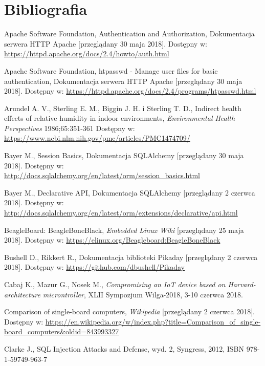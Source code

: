 \documentclass[a4paper,11pt,twoside]{article}
\begin{document}
\newpage
\section{Bibliografia}
\begin{thebibliography}{9}

Apache Software Foundation, Authentication and Authorization, Dokumentacja serwera HTTP Apache [przeglądany 30 maja 2018].
Dostępny w: \url{https://httpd.apache.org/docs/2.4/howto/auth.html}

Apache Software Foundation, htpasswd - Manage user files for basic authentication, Dokumentacja serwera HTTP Apache [przeglądany 30 maja 2018].
Dostępny w: \url{https://httpd.apache.org/docs/2.4/programs/htpasswd.html}

Arundel A. V., Sterling E. M., Biggin J. H. i Sterling T. D., Indirect health effects of relative humidity in indoor environments, \textit{Environmental Health Perspectives} 1986;65:351-361
Dostępny w: \url{https://www.ncbi.nlm.nih.gov/pmc/articles/PMC1474709/}

Bayer M., Session Basics, Dokumentacja SQLAlchemy [przeglądany 30 maja 2018].
Dostępny w: \url{http://docs.sqlalchemy.org/en/latest/orm/session_basics.html}

Bayer M., Declarative API, Dokumentacja SQLAlchemy [przeglądany 2 czerwca 2018].
Dostępny w: \url{http://docs.sqlalchemy.org/en/latest/orm/extensions/declarative/api.html}

BeagleBoard: BeagleBoneBlack, \textit{Embedded Linux Wiki} [przeglądany 25 maja 2018].
Dostępny w: \url{https://elinux.org/Beagleboard:BeagleBoneBlack}

Bushell D., Rikkert R., Dokumentacja biblioteki Pikaday [przeglądany 2 czerwca 2018].
Dostępny w: \url{https://github.com/dbushell/Pikaday}

Cabaj K., Mazur G., Nosek M., \textit{Compromising an IoT device based on Harvard-architecture microntroller}, XLII Sympozjum Wilga-2018, 3-10 czerwca 2018.

Comparison of single-board computers, \textit{Wikipedia} [przeglądany 2 czerwca 2018].
Dostępny w: \url{https://en.wikipedia.org/w/index.php?title=Comparison_of_single-board_computers&oldid=843993327}

Clarke J., SQL Injection Attacks and Defense, wyd. 2, Syngress, 2012, ISBN 978-1-59749-963-7  


\end{thebibliography}
\end{document}
